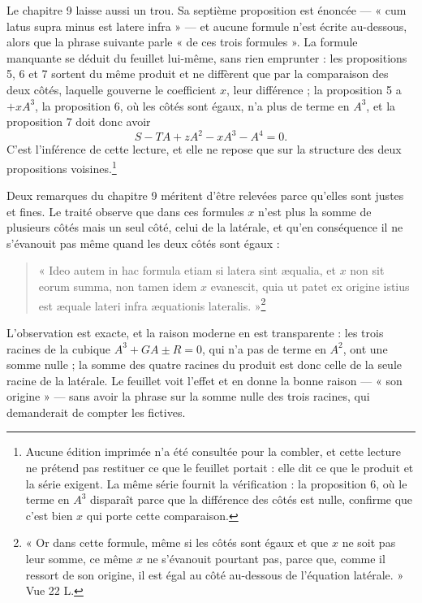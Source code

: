 \documentclass[11pt,a4paper]{article}
\begin{document}
Le chapitre 9 laisse aussi un trou. Sa septième proposition est énoncée — « cum
latus supra minus est latere infra » — et aucune formule n'est écrite au-dessous,
alors que la phrase suivante parle « de ces trois formules ». La formule
manquante se déduit du feuillet lui-même, sans rien emprunter : les propositions
5, 6 et 7 sortent du même produit et ne diffèrent que par la comparaison des
deux côtés, laquelle gouverne le coefficient $x$, leur différence ; la
proposition 5 a $+xA^3$, la proposition 6, où les côtés sont égaux, n'a plus de
terme en $A^3$, et la proposition 7 doit donc avoir
\[ S - TA + zA^2 - xA^3 - A^4 = 0. \]
C'est l'inférence de cette lecture, et elle ne repose que sur la structure des
deux propositions voisines.\footnote{Aucune édition imprimée n'a été consultée
pour la combler, et cette lecture ne prétend pas restituer ce que le feuillet
portait : elle dit ce que le produit et la série exigent. La même série fournit
la vérification : la proposition 6, où le terme en $A^3$ disparaît parce que la
différence des côtés est nulle, confirme que c'est bien $x$ qui porte cette
comparaison.}

Deux remarques du chapitre 9 méritent d'être relevées parce qu'elles sont justes
et fines. Le traité observe que dans ces formules $x$ n'est plus la somme de
plusieurs côtés mais un seul côté, celui de la latérale, et qu'en conséquence il
ne s'évanouit pas même quand les deux côtés sont égaux :

\begin{quote}
« Ideo autem in hac formula etiam si latera sint æqualia, et $x$ non sit eorum
summa, non tamen idem $x$ evanescit, quia ut patet ex origine istius est æquale
lateri infra æquationis lateralis. »\footnote{« Or dans cette formule, même si
les côtés sont égaux et que $x$ ne soit pas leur somme, ce même $x$ ne
s'évanouit pourtant pas, parce que, comme il ressort de son origine, il est égal
au côté au-dessous de l'équation latérale. » Vue 22 L.}
\end{quote}

L'observation est exacte, et la raison moderne en est transparente : les trois
racines de la cubique $A^3 + GA \pm R = 0$, qui n'a pas de terme en $A^2$, ont
une somme nulle ; la somme des quatre racines du produit est donc celle de la
seule racine de la latérale. Le feuillet voit l'effet et en donne la bonne
raison — « son origine » — sans avoir la phrase sur la somme nulle des trois
racines, qui demanderait de compter les fictives.
\end{document}
